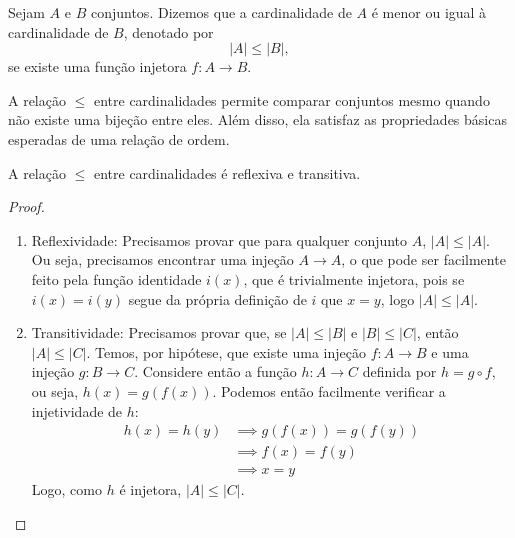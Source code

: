 \begin{definicao}
    \label{def:leq_cardinal}
    Sejam \(A\) e \(B\) conjuntos. Dizemos que a cardinalidade de \(A\) é
    menor ou igual à cardinalidade de \(B\), denotado por
    \[
        |A| \leq |B|,
    \]
    se existe uma função injetora \(f:A\to B\).
\end{definicao}

A relação \(\leq\) entre cardinalidades permite comparar conjuntos mesmo quando não existe uma bijeção entre eles. Além disso, ela satisfaz as propriedades básicas esperadas de uma relação de ordem.

\begin{proposicao}
    \label{prop:leq_cardinal_reflexiva_transitiva}
    A relação \(\leq\) entre cardinalidades é reflexiva e transitiva.
\end{proposicao}

\begin{proof}
    \begin{enumerate}
        \item Reflexividade: Precisamos provar que para qualquer conjunto \(A\), \(|A| \leq |A|\). Ou seja, precisamos encontrar uma injeção \(A \to A\), o que pode ser facilmente feito pela função identidade \(i(x)\), que é trivialmente injetora, pois se \(i(x) = i(y)\) segue da própria definição de \(i\) que \(x = y\), logo \(|A| \leq |A|\).
        \item Transitividade: Precisamos provar que, se \(|A| \leq |B|\) e \(|B| \leq |C|\), então \(|A| \leq |C|\). Temos, por hipótese, que existe uma injeção \(f: A \to B\) e uma injeção \(g: B \to C\). Considere então a função \(h: A \to C\) definida por \(h = g \circ f\), ou seja, \(h(x) = g(f(x))\). Podemos então facilmente verificar a injetividade de \(h\):
              \begin{align*}
                  h(x) = h(y) & \implies g(f(x)) = g(f(y)) \\
                              & \implies f(x) = f(y)       \\
                              & \implies x = y
              \end{align*}
              Logo, como \(h\) é injetora, \(|A| \leq |C|.\)
    \end{enumerate}
\end{proof}


